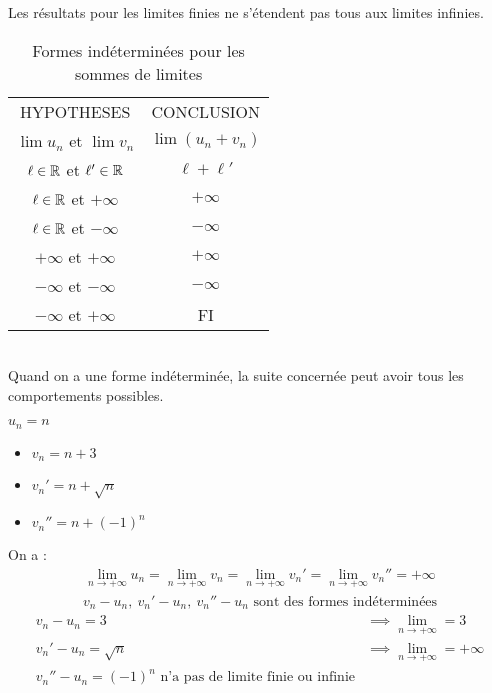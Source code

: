 \begin{remarque}
Les résultats pour les limites finies ne s'étendent pas tous aux limites infinies.
\begin{table}[!h]
\centering
\begin{tabular}{c c}
HYPOTHESES & CONCLUSION \\
$\lim u_n$ et  $\lim v_n$ & $\lim (u_n + v_n)$ \\
$\ell \in \mathbb{R}$ et $\ell ' \in \mathbb{R}$ & $\ell + \ell'$ \\
$\ell \in \mathbb{R}$ et $+\infty$ & $+\infty$ \\
$\ell \in \mathbb{R}$ et $-\infty$ & $-\infty$ \\
$+\infty$ et $+\infty$ & $+\infty$ \\
$-\infty$ et $-\infty$ & $-\infty$ \\
$-\infty$ et $+\infty$ & FI
\end{tabular}
\caption{Formes indéterminées pour les sommes de limites}
\end{table}
\\
Quand on a une forme indéterminée, la suite concernée peut avoir tous les comportements possibles.
\end{remarque}

\begin{exemple}
$u_n = n$
\begin{itemize}
    \item $v_n = n + 3$ 
    \item $v_n' = n + \sqrt{n}$
    \item $v_n'' = n + (-1)^{n}$
\end{itemize}
On a :
\begin{align*}
    \lim_{n \to +\infty} u_n = \lim_{n \to +\infty} v_n = \lim_{n \to +\infty} v_n' = \lim_{n \to +\infty} v_n'' = +\infty
\end{align*}
\begin{align*}
    v_n - u_n, \ v_n' - u_n, \ v_n'' - u_n \text{ sont des formes indéterminées}
\end{align*}
\begin{align*}
    v_n - u_n = 3 &\implies \lim_{n \to +\infty} = 3 \\
    v_n' - u_n = \sqrt{n} &\implies \lim_{n \to +\infty} = +\infty \\
    v_n'' -u_n = (-1)^n \text{ n'a pas de limite finie ou infinie}
\end{align*}
\end{exemple}

